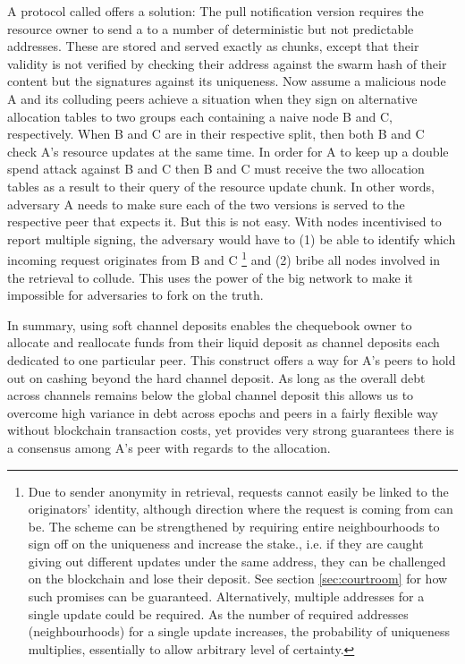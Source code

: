 A protocol called  offers a solution: 
The pull notification version requires the resource owner to send a  to a number of deterministic but not predictable addresses. These are stored and served exactly as chunks, except that their validity is not verified by checking  their address against the swarm hash of their content but the signatures against its uniqueness. Now assume a malicious node A and its colluding peers achieve a situation when they sign on alternative allocation tables to two groups each containing a naive node B and C, respectively. When B and C are in their respective split, then both B and C check A's resource updates at the same time. In order for A to keep up a double spend attack against B and C then B and C must receive the two allocation tables as a result to their query of the resource update chunk. In other words, adversary A needs to make sure each of the two versions is served to the respective peer that expects it. 
But this is not easy. With nodes incentivised to report multiple signing, the adversary would have to (1) be able to identify which incoming request originates from B and C%
%
\footnote{Due to sender anonymity in retrieval, requests cannot easily be linked to the originators' identity, although direction where the request is coming from can be. The scheme can be strengthened by requiring entire neighbourhoods to sign off on the uniqueness and increase the stake., i.e. if they are caught giving out different updates under the same address, they can be challenged on the blockchain and lose their deposit. See section \ref{sec:courtroom} for how such promises can be guaranteed. Alternatively, multiple addresses for a single update could be required.
As the number of required addresses (neighbourhoods) for a single update increases, the probability of uniqueness multiplies, essentially to allow arbitrary level of certainty.}
%
and (2) bribe all nodes involved in the retrieval to collude.
This uses the power of the big network to make it impossible for adversaries to fork on the truth.

In summary, using soft channel deposits enables the chequebook owner to allocate and reallocate funds from their liquid deposit as channel deposits each dedicated to one particular peer. 
This construct offers a way for A's peers to hold out on cashing beyond the hard channel deposit. As long as the overall debt across channels remains below the global channel deposit this  allows us to overcome high variance in debt across epochs and peers in a fairly flexible way without blockchain transaction costs, yet provides very strong guarantees there is a consensus among A's peer with regards to the allocation. 

